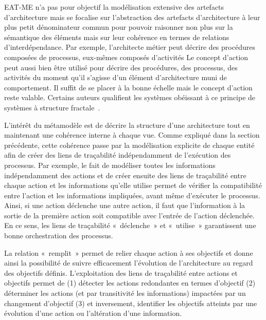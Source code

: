     EAT-ME n'a pas pour objectif la modélisation extensive des artefacts d'architecture mais se focalise sur
    l'abstraction des artefacts d'architecture à leur plus petit dénominateur commun pour pouvoir raisonner non plus
    sur la sémantique des éléments mais sur leur cohérence en termes de relations d'interdépendance. Par exemple, l'architecte métier 
    peut décrire des procédures composées de processus, eux-mêmes composés d'activités Le concept d'action peut aussi bien
    être utilisé pour décrire des procédures, des processus, des activités du moment qu'il s'agisse d'un élément d'architecture muni
    de comportement. Il suffit de se placer à la bonne échelle mais le concept d'action reste valable. Certains auteurs
    qualifient les systèmes obéissant à ce principe de systèmes à structure fractale~\cite{arsanjani2004service}.

    L'intérêt du métamodèle est de décrire la structure d'une architecture tout en maintenant une cohérence interne
    à chaque vue. Comme expliqué dans la section précédente, cette cohérence passe par la modélisation explicite
    de chaque entité afin de créer des liens de traçabilité indépendamment de l’exécution des processus.
    Par exemple, le fait de modéliser toutes les informations indépendamment des actions et de créer ensuite 
    des liens de traçabilité entre chaque action et les informations qu'elle utilise permet de vérifier la compatibilité
    entre l'action et les informations impliquées, avant même d'exécuter le processus. Ainsi, si une action déclenche une autre
    action, il faut que l'information à la sortie de la première action soit compatible avec l'entrée de l'action déclenchée.
    En ce sens, les liens de traçabilité «~déclenche~» et «~utilise~»  garantissent
    une bonne orchestration des processus.

    La relation «~remplit~» permet de relier chaque action à ses objectifs et donne ainsi la possibilité 
    de suivre efficacement l’évolution
    de l'architecture au regard des objectifs définis. L'exploitation des liens de traçabilité entre actions et objectifs
    permet de (1) détecter les actions redondantes en termes d'objectif (2) déterminer les actions (et par transitivité 
    les informations) impactées par un changement d'objectif (3) et inversement, identifier les objectifs atteints
    par une évolution d'une action ou l'altération d'une information.

